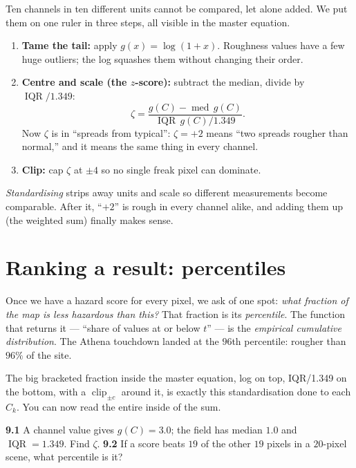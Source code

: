 \documentclass[11pt,oneside]{book}
\begin{document}
Ten channels in ten different units cannot be compared, let alone added. We put them on
one ruler in three steps, all visible in the master equation.

\begin{enumerate}[leftmargin=1.4em]
\item \textbf{Tame the tail:} apply $g(x)=\log(1+x)$. Roughness values have a few huge
outliers; the log squashes them without changing their order.
\item \textbf{Centre and scale (the $z$-score):} subtract the median, divide by
$\operatorname{IQR}/1.349$:
\[
\zeta=\frac{g(C)-\operatorname{med}\,g(C)}{\operatorname{IQR}\,g(C)/1.349}.
\]
Now $\zeta$ is in ``spreads from typical'': $\zeta=+2$ means ``two spreads rougher than
normal,'' and it means the same thing in every channel.
\item \textbf{Clip:} cap $\zeta$ at $\pm4$ so no single freak pixel can dominate.
\end{enumerate}

\begin{keyidea}
\emph{Standardising} strips away units and scale so different measurements become
comparable. After it, ``$+2$'' is rough in every channel alike, and adding them up
(the weighted sum) finally makes sense.
\end{keyidea}

\section{Ranking a result: percentiles}
Once we have a hazard score for every pixel, we ask of one spot: \emph{what fraction of
the map is less hazardous than this?} That fraction is its \emph{percentile}. The
function that returns it --- ``share of values at or below $t$'' --- is the
\emph{empirical cumulative distribution}. The Athena touchdown landed at the
$96$th percentile: rougher than $96\%$ of the site.

\begin{hatibox}
The big bracketed fraction inside the master equation, log on top, IQR/1.349 on the
bottom, with a $\operatorname{clip}_{\pm c}$ around it, is exactly this standardisation
done to each $C_k$. You can now read the entire inside of the sum.
\end{hatibox}

\begin{practice}
\textbf{9.1} A channel value gives $g(C)=3.0$; the field has median $1.0$ and
$\operatorname{IQR}=1.349$. Find $\zeta$. \quad\textbf{9.2} If a score beats $19$ of the
other $19$ pixels in a $20$-pixel scene, what percentile is it?
\end{practice}
\end{document}
